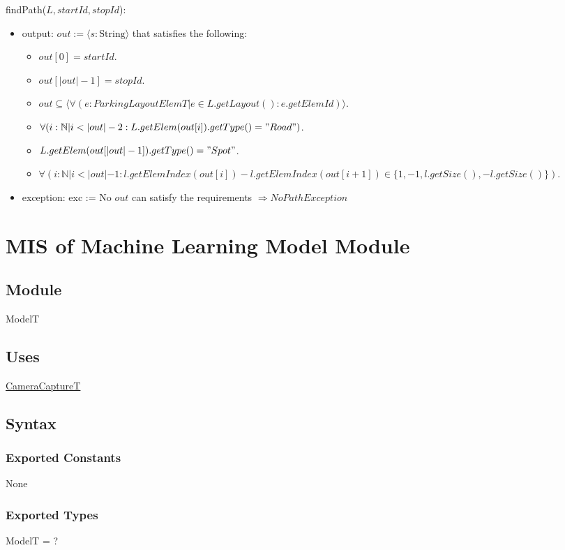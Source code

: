 \documentclass[12pt, titlepage]{article}
\begin{document}
\noindent findPath($L, startId, stopId$):
\begin{itemize}
\item output: $out := \langle s : \text{String} \rangle$ that satisfies the
following:
\begin{itemize}
\item $out[0] = startId$.
\item $out[|out| - 1] = stopId$.
\item $out \subseteq \langle \forall (e : ParkingLayoutElemT | e \in
L.getLayout() : e.getElemId) \rangle$.
\item $\forall (i : \mathbb{N} | i < |out| - 2 : L.getElem(out[i]).getType() =
"Road")$.
\item $L.getElem(out[|out| - 1]).getType() = "Spot"$.
\item $\forall (i : \mathbb{N} | i < |out| - 1 : l.getElemIndex(out[i]) -
l.getElemIndex(out[i + 1]) \in \{1, -1, l.getSize(), -l.getSize()\})$.
\end{itemize}
\item exception: exc := No $out$ can satisfy the requirements $\Rightarrow
NoPathException$
\end{itemize}

\newpage

\section{MIS of Machine Learning Model Module} 
\label{machineLearningModel:Module}

\subsection{Module}
ModelT

\subsection{Uses}
\hyperref[cameraCapture:Module]{CameraCaptureT}

\subsection{Syntax}

\subsubsection{Exported Constants}
None

\subsubsection{Exported Types}
ModelT = ?
\end{document}
